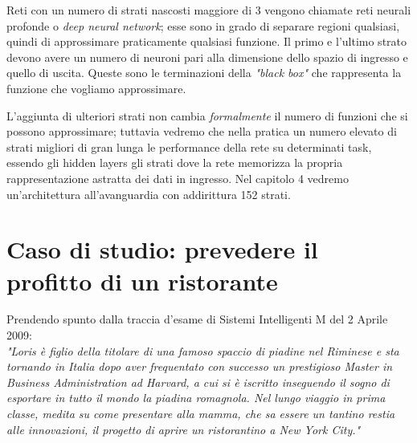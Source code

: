 Reti con un numero di strati nascosti maggiore di 3 vengono chiamate reti neurali profonde o \emph{deep neural network}; esse sono in grado di separare regioni qualsiasi, quindi di approssimare praticamente qualsiasi funzione. Il primo e l’ultimo strato devono avere un numero di neuroni pari alla dimensione dello spazio di ingresso e quello di uscita. Queste sono le terminazioni della \emph{"black box"} che rappresenta la funzione che vogliamo approssimare. 

L'aggiunta di ulteriori strati non cambia \emph{formalmente} il numero di funzioni che si possono approssimare; tuttavia vedremo che nella pratica un numero elevato di strati migliori di gran lunga le performance della rete su determinati task, essendo gli hidden layers gli strati dove la rete memorizza la propria rappresentazione astratta dei dati in ingresso. Nel capitolo 4 vedremo un'architettura all'avanguardia con addirittura 152 strati.
 

\section{Caso di studio: prevedere il profitto di un ristorante}
Prendendo spunto dalla traccia d'esame di Sistemi Intelligenti M del 2 Aprile 2009: \\
\textit{"Loris è figlio della titolare di una famoso spaccio di piadine nel Riminese e sta tornando in Italia
dopo aver frequentato con successo un prestigioso Master in Business Administration ad Harvard, a
cui si è iscritto inseguendo il sogno di esportare in tutto il mondo la piadina romagnola. Nel lungo
viaggio in prima classe, medita su come presentare alla mamma, che sa essere un tantino restia alle
innovazioni, il progetto di aprire un ristorantino a New York City."}

